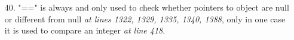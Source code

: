 \begin{itemize}
\item [40.] "==" is always and only used to check whether pointers to object are null or different from null  \textit{at lines 1322, 1329, 1335, 1340, 1388}, only in one case it is used to compare an integer \textit{at line 418}.
\end{itemize}